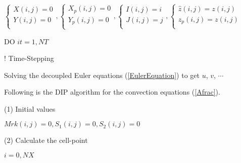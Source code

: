 \documentclass[review]{elsarticle}
\theoremstyle{plain}\newtheorem{definition}{\sc{Definition}}
\theoremstyle{defination}\newtheorem{example}{Example}[section]
\numberwithin{equation}{section}
\numberwithin{table}{section}
\begin{document}
{\hspace{0.5cm}
  \scriptsize{\color{black!80}
  \hspace{-0.7cm}
  $
  \left\{
  \begin{array}{l}
	X(i,j)=0\\
	Y(i,j)=0\\
	\end{array}
	\right.
,
\left\{
  \begin{array}{l}
	X_p(i,j)=0\\
	Y_p(i,j)=0\\
	\end{array}
	\right.
,
\left\{
  \begin{array}{l}
	I(i,j)=i\\
	J(i,j)=j\\
	\end{array}
	\right.
,
\left\{
  \begin{array}{l}
	\hat{z}(i,j)=z(i,j)\\
	z_p(i,j)=z(i,j)\\
	\end{array}
	\right.
	
$

\vspace{0.1cm}
\hspace{-0.48cm}
{ \color{black!60!blue!80}DO}
\color{black!80} $it=1,NT$} {\color{black!60} \hspace{2.3cm} ! Time-Stepping
  \color{black}

  \small \hspace{-0.0cm}
\hspace{-0.18cm}
Solving the decoupled Euler equations (\ref{EulerEquation}) to get $u$, $v$, $\cdots$

\hspace{-0.10cm}
Following is the DIP  algorithm for the convection equations (\ref{Afrac}).
\vspace{0.2cm}

 \normalsize (1) Initial values
  \scriptsize
  { \color{black!80}  
  \vspace{0.1cm}

  \hspace{0.5cm}
$
Mrk(i,j)=0,
S_1(i,j)=0,
S_2(i,j)=0
$
\vspace{0.1cm}

\normalsize \color{black}
(2) Calculate the cell-point
 \scriptsize 
 \vspace{0.1cm}

 { \color{black!80} $i=0,NX$}

}}}
\end{document}

